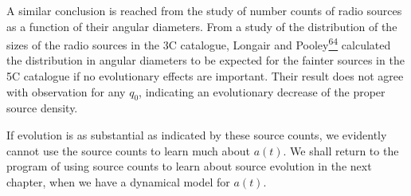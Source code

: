 A similar conclusion is reached from the study of number counts of radio
sources as a function of their angular diameters. From a study of the
distribution of the sizes of the radio sources in the 3C catalogue, Longair
and Pooley\hyperref[ch14-ref-64]{\textsuperscript{64}} calculated the
distribution in angular diameters to be expected for the fainter sources in
the 5C catalogue if no evolutionary effects are important. Their result does
not agree with observation for any \(q_0\), indicating an evolutionary
decrease of the proper source density.

If evolution is as substantial as indicated by these source counts, we
evidently cannot use the source counts to learn much about \(a(t)\). We
shall return to the program of using source counts to learn about source
evolution in the next chapter, when we have a dynamical model for \(a(t)\).

